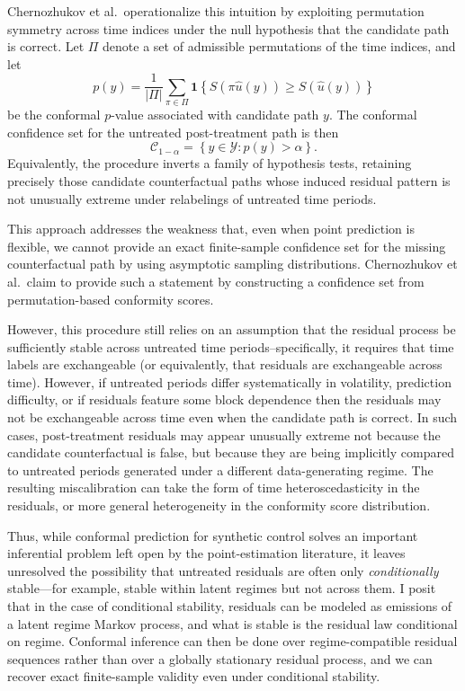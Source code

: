 \documentclass{article}
\begin{document}
Chernozhukov et al.\ operationalize this intuition by exploiting permutation symmetry across time indices under the null hypothesis that the candidate path is correct. Let $\Pi$ denote a set of admissible permutations of the time indices, and let
\[
p(y)
=
\frac{1}{|\Pi|}
\sum_{\pi\in\Pi}
\mathbf 1\!\left\{
S\!\left(\pi\hat u(y)\right)\geq S\!\left(\hat u(y)\right)
\right\}
\]
be the conformal $p$-value associated with candidate path $y$. The conformal confidence set for the untreated post-treatment path is then
\[
\mathcal C_{1-\alpha}
=
\left\{
y\in\mathcal Y:
p(y)>\alpha
\right\}.
\]
Equivalently, the procedure inverts a family of hypothesis tests, retaining precisely those candidate counterfactual paths whose induced residual pattern is not unusually extreme under relabelings of untreated time periods.

This approach addresses the weakness that, even when point prediction is flexible, we cannot provide an exact finite-sample confidence set for the missing counterfactual path by using asymptotic sampling distributions. Chernozhukov et al.\ claim to provide such a statement by constructing a confidence set from permutation-based conformity scores.

However, this procedure still relies on an assumption that the residual process be sufficiently stable across untreated time periods--specifically, it requires that time labels are exchangeable (or equivalently, that residuals are exchangeable across time). However, if untreated periods differ systematically in volatility, prediction difficulty, or if residuals feature some block dependence then the residuals may not be exchangeable across time even when the candidate path is correct. In such cases, post-treatment residuals may appear unusually extreme not because the candidate counterfactual is false, but because they are being implicitly compared to untreated periods generated under a different data-generating regime. The resulting miscalibration can take the form of time heteroscedasticity in the residuals, or more general heterogeneity in the conformity score distribution.

Thus, while conformal prediction for synthetic control solves an important inferential problem left open by the point-estimation literature, it leaves unresolved the possibility that untreated residuals are often only \emph{conditionally} stable---for example, stable within latent regimes but not across them. I posit that in the case of conditional stability, residuals can be modeled as emissions of a latent regime Markov process, and what is stable is the residual law conditional on regime. Conformal inference can then be done over regime-compatible residual sequences rather than over a globally stationary residual process, and we can recover exact finite-sample validity even under conditional stability.
\end{document}
